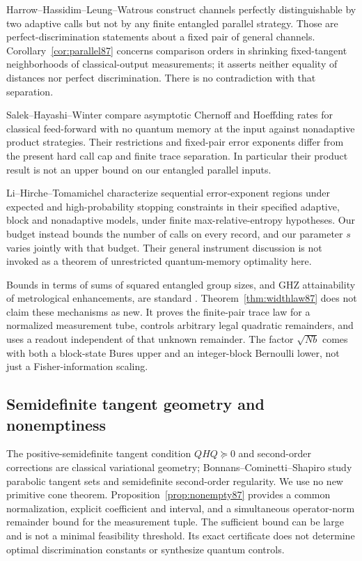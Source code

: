 Harrow--Hassidim--Leung--Watrous \cite[Sections~3--4]{HHLW87}
construct channels perfectly distinguishable by two adaptive calls
but not by any finite entangled parallel strategy.  Those are
perfect-discrimination statements about a fixed pair of general
channels.  Corollary~\ref{cor:parallel87} concerns comparison orders
in shrinking fixed-tangent neighborhoods of classical-output
measurements; it asserts neither equality of distances nor perfect
discrimination.  There is no contradiction with that separation.

Salek--Hayashi--Winter \cite[Theorem~9 and Remark~10]{SHW87}
compare asymptotic Chernoff and Hoeffding rates for classical
feed-forward with no quantum memory at the input against nonadaptive
product strategies.  Their restrictions and fixed-pair error
exponents differ from the present hard call cap and finite trace
separation.  In particular their product result is not an upper
bound on our entangled parallel inputs.

Li--Hirche--Tomamichel \cite[Theorems~3.1--3.3]{LHT87}
characterize sequential error-exponent regions under expected and
high-probability stopping constraints in their specified adaptive,
block and nonadaptive models, under finite max-relative-entropy
hypotheses.  Our budget instead bounds the number of calls on every
record, and our parameter $s$ varies jointly with that budget.
Their general instrument discussion is not invoked as a theorem of
unrestricted quantum-memory optimality here.

Bounds in terms of sums of squared entangled group sizes, and GHZ
attainability of metrological enhancements, are standard
\cite{Hyllus78,Toth78}.  Theorem~\ref{thm:widthlaw87} does not
claim these mechanisms as new.  It proves the finite-pair trace law
for a normalized measurement tube, controls arbitrary legal quadratic
remainders, and uses a readout independent of that unknown remainder.
The factor $\sqrt{Nb}$ comes with both a block-state Bures upper and
an integer-block Bernoulli lower, not just a Fisher-information scaling.

\subsection{Semidefinite tangent geometry and nonemptiness}
The positive-semidefinite tangent condition $QHQ\succeq0$ and
second-order corrections are classical variational geometry;
Bonnans--Cominetti--Shapiro \cite{BCS87} study parabolic tangent
sets and semidefinite second-order regularity.  We use no new
primitive cone theorem.  Proposition~\ref{prop:nonempty87}
provides a common normalization, explicit coefficient and interval,
and a simultaneous operator-norm remainder bound for the measurement
tuple.  The sufficient bound can be large and is not a minimal
feasibility threshold.  Its exact certificate does not determine
optimal discrimination constants or synthesize quantum controls.

